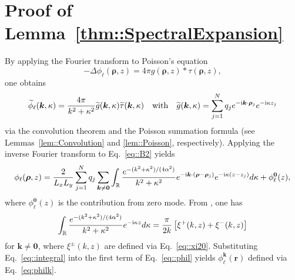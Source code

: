 
\section{Proof of Lemma~\ref{thm::SpectralExpansion}}\label{app::deriv}
By applying the Fourier transform to Poisson's equation
\begin{equation}\label{eq::B.1}
	-\Delta\phi_{\ell}(\bm{\rho},z)=4\pi g(\bm{\rho},z)\ast\tau(\bm{\rho},z),
\end{equation}
one obtains  
\begin{equation}\label{eq::B2}
	\widetilde{\phi}_{\ell}(\bm{k},\kappa)=\frac{4\pi}{k^2+\kappa^2}\widetilde{g}(\bm{k},\kappa)\widetilde{\tau}(\bm{k},\kappa)\quad\text{with}\quad \widetilde{g}(\bm{k},\kappa)=\sum_{j=1}^{N}q_{j} e^{-\mathrm{i} \bm{k}\cdot\bm{\rho}_{j}}e^{-\mathrm{i} \kappa z_{j}}
\end{equation}
via the convolution theorem and the Poisson summation formula (see Lemmas~\ref{lem::Convolution} and \ref{lem::Poisson}, respectively). Applying the inverse Fourier transform to Eq.~\eqref{eq::B2} yields
\begin{equation}\label{eq::phil}
	\phi_{\ell}(\bm{\rho},z)=\frac{2}{L_xL_y}\sum_{j=1}^{N}q_{j}\sum_{\bm{k}\neq\bm{0}}\int_{\mathbb{R}}\frac{e^{-(k^2+\kappa^2)/(4\alpha^2)}}{k^2+\kappa^2}e^{-\mathrm{i} \bm{k}\cdot(\bm{\rho}-\bm{\rho}_{j})}e^{-\mathrm{i} \kappa(z-z_{j})}d\kappa + \phi^{\bm{0}}_{\ell}(z),
\end{equation}
where $\phi^{\bm{0}}_{\ell}(z)$ is the contribution from zero mode. From \cite{oberhettinger2012tables}, one has 
\begin{equation}\label{eq::integral}
	\int_{\mathbb{R}} \frac{e^{-(k^2+\kappa^2)/(4\alpha^2)}}{k^2+\kappa^2} e^{-\mathrm{i} \kappa z} d\kappa = \frac{\pi}{2k} \left[\xi^{+}(k,z)+\xi^{-}(k,z)\right]
\end{equation}
for $\bm{k}\neq\bm{0}$, where $\xi^{\pm}(k,z)$ are defined via Eq.~\eqref{eq::xi20}. Substituting Eq.~\eqref{eq::integral} into the first term of Eq.~\eqref{eq::phil} yields $\phi_{\ell}^{\bm{k}}(\bm{r})$ defined via Eq.~\eqref{eq:philk}.

